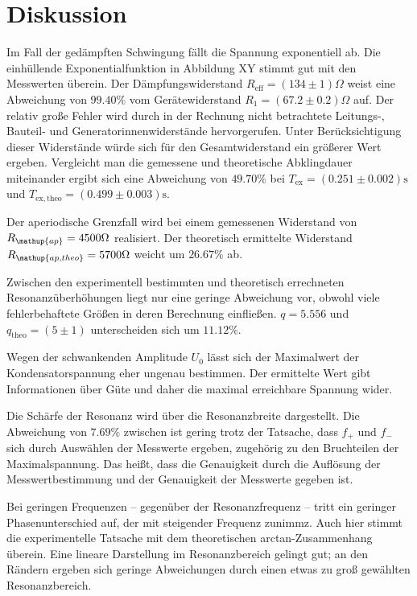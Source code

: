 \section{Diskussion}
\label{sec:Diskussion}

Im Fall der gedämpften Schwingung fällt die Spannung exponentiell ab. Die einhüllende Exponentialfunktion in Abbildung XY stimmt gut mit den Messwerten überein. Der Dämpfungswiderstand $R_\mathup{eff}=(134\pm1)\si{\Omega}$ weist eine Abweichung von $99.40\%$ vom Gerätewiderstand $R_1=(67.2\pm0.2)\si{\Omega}$ auf. Der relativ große Fehler wird durch in der Rechnung nicht betrachtete Leitungs-, Bauteil- und Generatorinnenwiderstände hervorgerufen. Unter Berücksichtigung dieser Widerstände würde sich für den Gesamtwiderstand ein größerer Wert ergeben.
Vergleicht man die gemessene und theoretische Abklingdauer miteinander ergibt sich eine Abweichung von $49.70\%$ bei $T_\mathup{ex}=(0.251\pm0.002)\si\second$ und $T_\mathup{ex,theo}=(0.499\pm0.003)\si\second$. 

Der aperiodische Grenzfall wird bei einem gemessenen Widerstand von $R_\mathup{ap}=4500\si\Omega$ realisiert. Der theoretisch ermittelte Widerstand $R_\mathup{ap,theo}=5700\si\Omega$ weicht um $26.67\%$ ab.

Zwischen den experimentell bestimmten und theoretisch errechneten Resonanzüberhöhungen liegt nur eine geringe Abweichung vor, obwohl viele fehlerbehaftete Größen in deren Berechnung einfließen. $q=5.556$ und $q_\mathup{theo}=(5\pm1)$ unterscheiden sich um $11.12\%$.

Wegen der schwankenden Amplitude $U_0$ lässt sich der Maximalwert der Kondensatorspannung eher ungenau bestimmen. Der ermittelte Wert gibt Informationen über Güte und daher die maximal erreichbare Spannung wider.

Die Schärfe der Resonanz wird über die Resonanzbreite dargestellt. Die Abweichung von $7.69\%$ zwischen %
ist gering trotz der Tatsache, dass $f_+$ und $f_-$ sich durch Auswählen der Messwerte ergeben, zugehörig zu den Bruchteilen der Maximalspannung. Das heißt, dass die Genauigkeit durch die Auflösung der Messwertbestimmung und der Genauigkeit der Messwerte gegeben ist.

Bei geringen Frequenzen -- gegenüber der Resonanzfrequenz -- tritt ein geringer Phasenunterschied auf, der mit steigender Frequenz zunimmz. Auch hier stimmt die experimentelle Tatsache mit dem theoretischen arctan-Zusammenhang überein. 
Eine lineare Darstellung im Resonanzbereich gelingt gut; an den Rändern ergeben sich geringe Abweichungen durch einen etwas zu groß gewählten Resonanzbereich.
